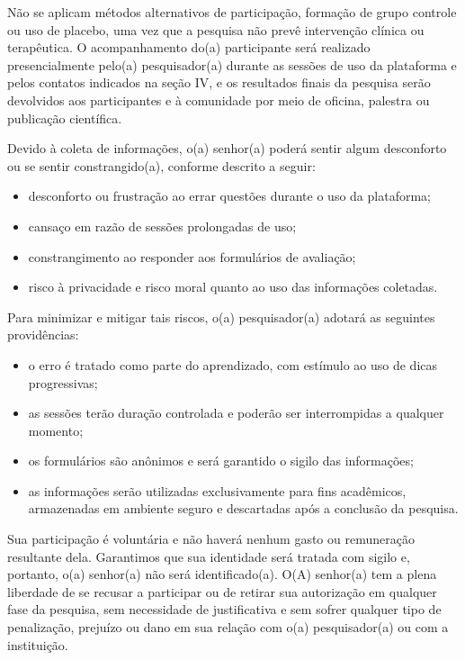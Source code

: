 Não se aplicam métodos alternativos de participação, formação de grupo controle ou uso de placebo, uma vez que a pesquisa não prevê intervenção clínica ou terapêutica. O acompanhamento do(a) participante será realizado presencialmente pelo(a) pesquisador(a) durante as sessões de uso da plataforma e pelos contatos indicados na seção IV, e os resultados finais da pesquisa serão devolvidos aos participantes e à comunidade por meio de oficina, palestra ou publicação científica.

Devido à coleta de informações, o(a) senhor(a) poderá sentir algum desconforto ou se sentir constrangido(a), conforme descrito a seguir:

\begin{itemize}
    \item desconforto ou frustração ao errar questões durante o uso da plataforma;
    \item cansaço em razão de sessões prolongadas de uso;
    \item constrangimento ao responder aos formulários de avaliação;
    \item risco à privacidade e risco moral quanto ao uso das informações coletadas.
\end{itemize}

Para minimizar e mitigar tais riscos, o(a) pesquisador(a) adotará as seguintes providências:

\begin{itemize}
    \item o erro é tratado como parte do aprendizado, com estímulo ao uso de dicas progressivas;
    \item as sessões terão duração controlada e poderão ser interrompidas a qualquer momento;
    \item os formulários são anônimos e será garantido o sigilo das informações;
    \item as informações serão utilizadas exclusivamente para fins acadêmicos, armazenadas em ambiente seguro e descartadas após a conclusão da pesquisa.
\end{itemize}

Sua participação é voluntária e não haverá nenhum gasto ou remuneração resultante dela. Garantimos que sua identidade será tratada com sigilo e, portanto, o(a) senhor(a) não será identificado(a). O(A) senhor(a) tem a plena liberdade de se recusar a participar ou de retirar sua autorização em qualquer fase da pesquisa, sem necessidade de justificativa e sem sofrer qualquer tipo de penalização, prejuízo ou dano em sua relação com o(a) pesquisador(a) ou com a instituição.

